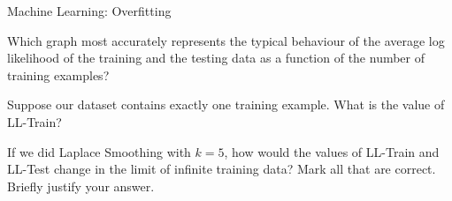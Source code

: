 \begin{problem}[10]{Machine Learning: Overfitting}
\vspace{-0.3cm}
\begin{question}[2] Which graph most accurately represents the typical behaviour of the average log likelihood of the training and the testing data as a function of the number of training examples?
\begin{multicols}{6}
\begin{itemize}[label=, itemsep=12pt, topsep=12pt]
\OneA
\end{itemize}
\end{multicols}

\end{question}
\newpage
\begin{question}[2]
Suppose our dataset contains exactly one training example. What is the value of LL-Train?

\begin{multicols}{5}

\OneB

\end{multicols}

\end{question}

\begin{question}[3]
If we did Laplace Smoothing with $k=5$, how would the values of LL-Train and LL-Test change in the limit of infinite training data? Mark all that are correct. Briefly justify your answer.
\begin{multicols}{2}
\begin{itemize}[label=, itemsep=12pt, topsep=12pt]
\OneC
\end{itemize}
\end{multicols}
\end{question}


\end{problem}
